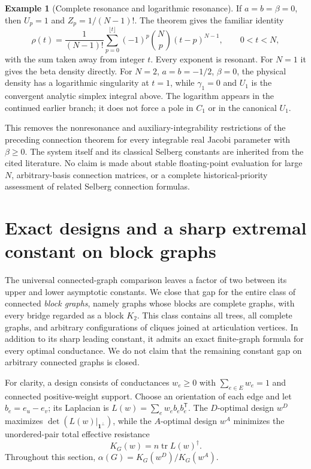 \documentclass[11pt,a4paper]{article}
\theoremstyle{definition}
\newtheorem{example}[theorem]{Example}
\theoremstyle{remark}
\numberwithin{equation}{section}
\begin{document}
\begin{example}[Complete resonance and logarithmic resonance]
If $a=b=\beta=0$, then $U_p=1$ and
$Z_p=1/(N-1)!$. The theorem gives the familiar identity
\[
 \rho(t)=\frac1{(N-1)!}\sum_{p=0}^{\lfloor t\rfloor}
                     (-1)^p\binom Np(t-p)^{N-1},\qquad 0<t<N,
\]
with the sum taken away from integer $t$. Every exponent is resonant.
For $N=1$ it gives the beta density directly.
For $N=2$, $a=b=-1/2$, $\beta=0$, the physical density has a
logarithmic singularity at $t=1$, while $\gamma_1=0$ and $U_1$ is
the convergent analytic simplex integral above. The logarithm appears
in the continued earlier branch; it does not force a pole in $C_1$
or in the canonical $U_1$.
\end{example}

This removes the nonresonance and auxiliary-integrability restrictions
of the preceding connection theorem for every integrable real Jacobi
parameter with $\beta\ge0$. The system itself and its classical
Selberg constants are inherited from the cited literature. No
claim is made about stable floating-point evaluation for large $N$,
arbitrary-basis connection matrices, or a complete historical-priority
assessment of related Selberg connection formulas.



\section{Exact designs and a sharp extremal constant on block graphs}
\label{p4:sec:block-global}

The universal connected-graph comparison leaves a factor of two
between its upper and lower asymptotic constants.
We close that gap for the entire class of connected \emph{block graphs},
namely graphs whose blocks are complete graphs, with every bridge
regarded as a block $K_2$.
This class contains all trees, all complete graphs, and arbitrary
configurations of cliques joined at articulation vertices.
In addition to its sharp leading constant, it admits an exact
finite-graph formula for every optimal conductance.
We do not claim that the remaining constant gap on arbitrary connected
graphs is closed.

For clarity, a design consists of conductances $w_e\geq0$ with
$\sum_{e\in E}w_e=1$ and connected positive-weight support.
Choose an orientation of each edge and let $b_e=e_u-e_v$; its
Laplacian is $L(w)=\sum_e w_e b_e b_e^{\mathsf T}$.
The $D$-optimal design $w^D$ maximizes
$\det(L(w)|_{\mathbf1^\perp})$, while the $A$-optimal design $w^A$
minimizes the unordered-pair total effective resistance
\[
 K_G(w)=n\operatorname{tr}L(w)^\dagger.
\]
Throughout this section,
$\alpha(G)=K_G(w^D)/K_G(w^A)$.
\end{document}
